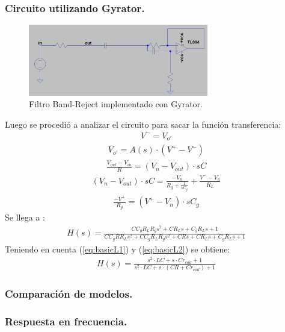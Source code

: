 \documentclass[a4paper]{article}
\begin{document}
\subsubsection{Circuito utilizando Gyrator.}
\begin{figure}[H]	
	\centering
	\includegraphics[width=0.7\textwidth]{ImagenesEj2/gyrBR.PNG}
	\caption{Filtro Band-Reject implementado con Gyrator.}
	\label{fig:gyrBR}
\end{figure}
Luego se procedió a analizar el circuito para sacar la función transferencia:
\begin{align}V^- = V_{o'}\end{align}
\begin{align}V_{o'} = A(s)\cdot (V^+-V^-)\end{align}
\begin{align}\frac{V_{out}-V_{in}}{R}=(V_n-V_{out})\cdot sC\end{align}
\begin{align}(V_n-V_{out})\cdot sC = \frac{-V_n}{R_g+\frac{1}{sC_g}}+\frac{V^--V_n}{R_L}\end{align}
\begin{align}\frac{-V^+}{R_g}=(V^+-V_n)\cdot sC_g\end{align}
Se llega a :
\begin{align}  H(s)=\frac{C C_{g} R_{L} R_{g} s^{2} + C R_{L} s + C_{g} R_{L} s + 1}{C C_{g} R R_{L} s^{2} + C C_{g} R_{L} R_{g} s^{2} + C R s + C R_{L} s + C_{g} R_{L} s + 1} \end{align}
Teniendo en cuenta (\ref{eq:basicL1}) y (\ref{eq:basicL2}) se obtiene:
\begin{align}  H(s)=\frac{ s^{2}\cdot  LC + s \cdot  C r_{coil} + 1}{ s^{2}\cdot LC + s\cdot (C R+Cr_{coil}) + 1} 
\label{eq:BRG}
\end{align}
\subsubsection{Comparación de modelos.}
\subsubsection{Respuesta en frecuencia.}
\end{document}
